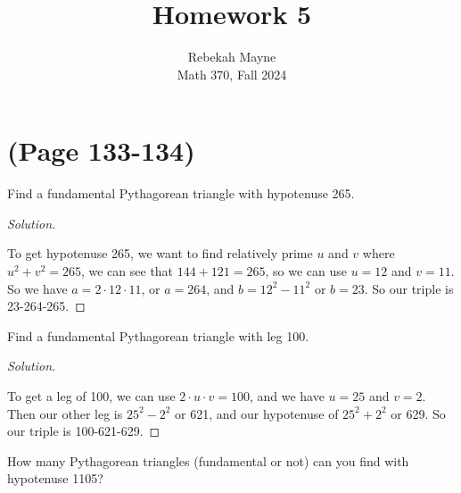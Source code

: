 \documentclass[11pt]{article}
\newenvironment{problem}[2][Problem]{\begin{trivlist}
\item[\hskip \labelsep {\bfseries #1}\hskip \labelsep {\bfseries #2.}]}{\end{trivlist}}
\newenvironment{solution}
  {\renewcommand\qedsymbol{$~$}\begin{proof}[Solution]$ $\par\nobreak\ignorespaces}
  {\end{proof}}
\begin{document}
\title{Homework 5}
\author{Rebekah Mayne\\
  Math 370, Fall 2024}
\maketitle


\section{(Page 133-134)}

\begin{problem}{2}
Find a fundamental Pythagorean triangle with hypotenuse 265.
\end{problem}

\begin{solution}
  To get hypotenuse 265, we want to find relatively prime $u$ and $v$ where $u^2+v^2=265$, we can see that $144+121=265$, so we can use $u=12$ and $v=11$. So we have $a=2\cdot 12\cdot 11$, or $a=264$, and $b=12^2-11^2$ or $b=23$. So our triple is 23-264-265.
\end{solution}


\begin{problem}{3}
Find a fundamental Pythagorean triangle with leg 100.
\end{problem}

\begin{solution}
  To get a leg of 100, we can use $2\cdot u\cdot v=100$, and we have $u=25$ and $v=2$. Then our other leg is $25^2-2^2$ or 621, and our hypotenuse of $25^2+2^2$ or 629. So our triple is 100-621-629.
\end{solution}



\begin{problem}{4}
How many Pythagorean triangles (fundamental or not) can you find with hypotenuse 1105?
\end{problem}
\end{document}
